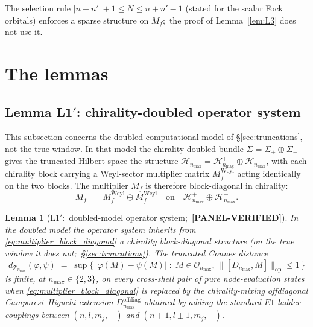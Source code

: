 \documentclass[11pt,a4paper]{article}
\theoremstyle{plain}
\newtheorem{lemma}[theorem]{Lemma}
\theoremstyle{definition}
\newcommand{\nmax}{n_{\max}}
\newcommand{\Hilb}{\mathcal{H}}
\newcommand{\Op}{\mathcal{O}}
\newcommand{\Tcal}{\mathcal{T}}
\newcommand{\opnorm}[1]{\lVert #1 \rVert_{\mathrm{op}}}
\newcommand{\Mat}{M}
\begin{document}
The selection rule $|n - n'| + 1 \le N \le n + n' - 1$ (stated for
the scalar Fock orbitals) enforces a sparse structure on $\Mat_f$;\
the proof of Lemma~\ref{lem:L3} does not use it.

\section{The lemmas}\label{sec:lemmas}

\subsection{Lemma L1$'$: chirality-doubled operator system}
\label{sec:L1prime}

This subsection concerns the doubled computational model of
\S\ref{sec:truncations}, not the true window.  In that model the
chirality-doubled bundle $\Sigma = \Sigma_+ \oplus \Sigma_-$
gives the truncated Hilbert space the structure
$\Hilb_{\nmax} = \Hilb^+_{\nmax} \oplus \Hilb^-_{\nmax}$, with each
chirality block carrying a Weyl-sector multiplier matrix
$\Mat_f^{\mathrm{Weyl}}$ acting identically on the two blocks. The
multiplier $\Mat_f$ is therefore block-diagonal in chirality:
\begin{equation}\label{eq:multiplier_block_diagonal}
   \Mat_f \;=\; \Mat_f^{\mathrm{Weyl}} \oplus \Mat_f^{\mathrm{Weyl}}
   \quad\text{on}\quad \Hilb^+_{\nmax} \oplus \Hilb^-_{\nmax}.
\end{equation}

\begin{lemma}[L1$'$:\ doubled-model operator system;\
\textbf{[PANEL-VERIFIED]}]
\label{lem:L1prime}
In the doubled model the operator system inherits from
\eqref{eq:multiplier_block_diagonal} a chirality block-diagonal
structure (on the true window it does not;\ \S\ref{sec:truncations}). The truncated Connes distance
\begin{equation}\label{eq:connes_distance_def}
   d_{\Tcal_{\nmax}}(\varphi, \psi)
   \;=\; \sup\bigl\{\,|\varphi(M) - \psi(M)| \;:\;
   M \in \Op_{\nmax},\, \opnorm{[D_{\nmax}, M]} \le 1 \,\bigr\}
\end{equation}
is finite, at $\nmax \in \{2, 3\}$, on every cross-shell pair of pure
node-evaluation states when \eqref{eq:multiplier_block_diagonal} is replaced by the
\emph{chirality-mixing offdiagonal Camporesi--Higuchi extension}
$D_{\nmax}^{\mathrm{offdiag}}$ obtained by adding the standard
$E1$ ladder couplings between $(n, l, m_j, +)$ and $(n+1, l \pm 1, m_j,
-)$.
\end{lemma}
\end{document}
